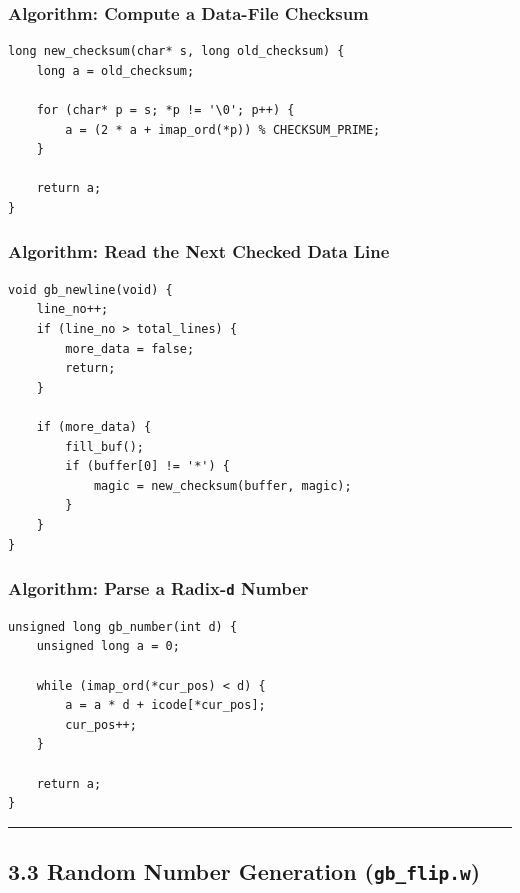 \documentclass[11pt]{article}
\begin{document}
\subsubsection{Algorithm: Compute a Data-File Checksum}\label{algorithm-compute-a-data-file-checksum}

\begin{verbatim}
long new_checksum(char* s, long old_checksum) {
    long a = old_checksum;

    for (char* p = s; *p != '\0'; p++) {
        a = (2 * a + imap_ord(*p)) % CHECKSUM_PRIME;
    }

    return a;
}
\end{verbatim}

\subsubsection{Algorithm: Read the Next Checked Data Line}\label{algorithm-read-the-next-checked-data-line}

\begin{verbatim}
void gb_newline(void) {
    line_no++;
    if (line_no > total_lines) {
        more_data = false;
        return;
    }

    if (more_data) {
        fill_buf();
        if (buffer[0] != '*') {
            magic = new_checksum(buffer, magic);
        }
    }
}
\end{verbatim}

\subsubsection{\texorpdfstring{Algorithm: Parse a Radix-\texttt{d} Number}{Algorithm: Parse a Radix-d Number}}\label{algorithm-parse-a-radix-d-number}

\begin{verbatim}
unsigned long gb_number(int d) {
    unsigned long a = 0;

    while (imap_ord(*cur_pos) < d) {
        a = a * d + icode[*cur_pos];
        cur_pos++;
    }

    return a;
}
\end{verbatim}

\begin{center}\rule{0.5\linewidth}{0.5pt}\end{center}

\subsection{\texorpdfstring{3.3 Random Number Generation (\texttt{gb\_flip.w})}{3.3 Random Number Generation (gb\_flip.w)}}\label{random-number-generation-gb_flip.w}
\end{document}
